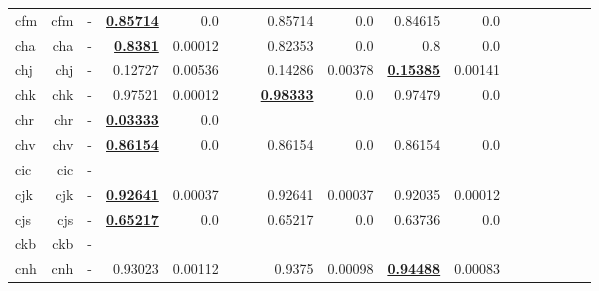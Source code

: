 \documentclass[11pt]{article}
\begin{document}
\begin{table*}[h]
{\begin{tabular}{lrrrrrrrrrrrrrrrr}
cfm         & cfm         & -         & \textbf{\underline{0.85714}}         & 0.0         &          &          & 0.85714         & 0.0         & 0.84615         & 0.0         &          &          &          &          \\
cha         & cha         & -         & \textbf{\underline{0.8381}}         & 0.00012         &          &          & 0.82353         & 0.0         & 0.8         & 0.0         &          &          &          &          \\
chj         & chj         & -         & 0.12727         & 0.00536         &          &          & 0.14286         & 0.00378         & \textbf{\underline{0.15385}}         & 0.00141         &          &          &          &          \\
chk         & chk         & -         & 0.97521         & 0.00012         &          &          & \textbf{\underline{0.98333}}         & 0.0         & 0.97479         & 0.0         &          &          &          &          \\
chr         & chr         & -         & \textbf{\underline{0.03333}}         & 0.0         &          &          &          &          &          &          &          &          &          &          \\
chv         & chv         & -         & \textbf{\underline{0.86154}}         & 0.0         &          &          & 0.86154         & 0.0         & 0.86154         & 0.0         &          &          &          &          \\
cic         & cic         & -         &          &          &          &          &          &          &          &          &          &          &          &          \\
cjk         & cjk         & -         & \textbf{\underline{0.92641}}         & 0.00037         &          &          & 0.92641         & 0.00037         & 0.92035         & 0.00012         &          &          &          &          \\
cjs         & cjs         & -         & \textbf{\underline{0.65217}}         & 0.0         &          &          & 0.65217         & 0.0         & 0.63736         & 0.0         &          &          &          &          \\
ckb         & ckb         & -         &          &          &          &          &          &          &          &          &          &          &          &          \\
cnh         & cnh         & -         & 0.93023         & 0.00112         &          &          & 0.9375         & 0.00098         & \textbf{\underline{0.94488}}         & 0.00083         &          &          &          &          \\

\end{tabular}}
\end{table*}
\end{document}
